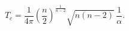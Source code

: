 \begin{equation}
T_c=\frac{1}{4\pi}\left(\frac{n}{2}\right)^{\frac{1}{n-2}}\sqrt{n(n-2)}
\,\frac{1}{\alpha}.
\end{equation}

